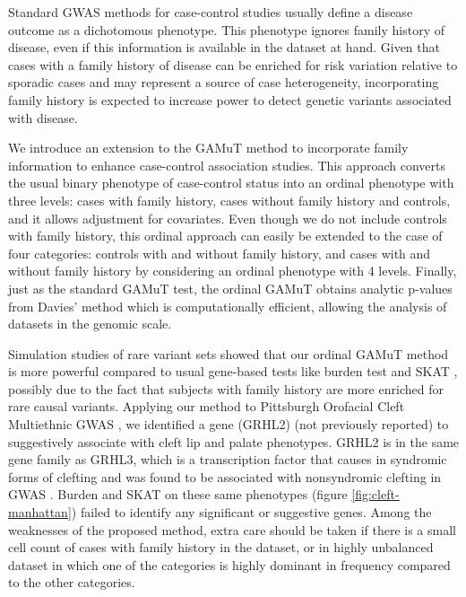 \documentclass[]{article}
\theoremstyle{definition}
\theoremstyle{definition}
\theoremstyle{definition}
\theoremstyle{remark}
\begin{document}
Standard GWAS methods for case-control studies usually define a disease
outcome as a dichotomous phenotype. This phenotype ignores family
history of disease, even if this information is available in the dataset
at hand. Given that cases with a family history of disease can be
enriched for risk variation relative to sporadic cases and may represent
a source of case heterogeneity, incorporating family history is expected
to increase power to detect genetic variants associated with disease.

We introduce an extension to the GAMuT method \citep{Broadaway2016} to
incorporate family information to enhance case-control association
studies. This approach converts the usual binary phenotype of
case-control status into an ordinal phenotype with three levels: cases
with family history, cases without family history and controls, and it
allows adjustment for covariates. Even though we do not include controls
with family history, this ordinal approach can easily be extended to the
case of four categories: controls with and without family history, and
cases with and without family history by considering an ordinal
phenotype with 4 levels. Finally, just as the standard GAMuT test, the
ordinal GAMuT obtains analytic p-values from Davies' method
\citep{Davies1980} which is computationally efficient, allowing the
analysis of datasets in the genomic scale.

Simulation studies of rare variant sets showed that our ordinal GAMuT
method is more powerful compared to usual gene-based tests like burden
test \citep{Li2008} and SKAT \citep{Wu2011}, possibly due to the fact
that subjects with family history are more enriched for rare causal
variants. Applying our method to Pittsburgh Orofacial Cleft Multiethnic
GWAS \citep{Leslie2016, Leslie2016b}, we identified a gene (GRHL2) (not
previously reported) to suggestively associate with cleft lip and palate
phenotypes. GRHL2 is in the same gene family as GRHL3, which is a
transcription factor that causes in syndromic forms of clefting and was
found to be associated with nonsyndromic clefting in GWAS
\citep{Leslie2016, Leslie2016b, Carpinelli2017, PeyrardJanvid2014}.
Burden and SKAT on these same phenotypes (figure
\ref{fig:cleft-manhattan}) failed to identify any significant or
suggestive genes. Among the weaknesses of the proposed method, extra
care should be taken if there is a small cell count of cases with family
history in the dataset, or in highly unbalanced dataset in which one of
the categories is highly dominant in frequency compared to the other
categories.
\end{document}
